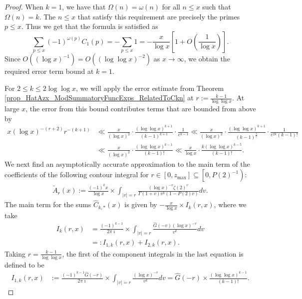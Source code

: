 \documentclass[11pt,reqno,a4letter]{article}
\numberwithin{figure}{section}
\numberwithin{table}{section}
\theoremstyle{plain}
\numberwithin{theorem}{section}
\theoremstyle{definition}
\begin{document}
\begin{proof} 
When $k = 1$, we have that $\Omega(n) = \omega(n)$ for all $n \leq x$ such that $\Omega(n) = k$. 
The $n \leq x$ that satisfy this requirement are precisely the primes $p \leq x$. 
Thus we get that the formula is satisfied as 
\[
\sum_{p \leq x} (-1)^{\omega(p)} C_1(p) = -\sum_{p \leq x} 1 = 
     - \frac{x}{\log x} \left[1 + O\left(\frac{1}{\log x}\right)\right]. 
\]
Since $O((\log x)^{-1}) = O((\log\log x)^{-2})$ as $x \rightarrow \infty$, 
we obtain the required error term bound at $k = 1$. 

For $2 \leq k \leq 2\log\log x$, we will apply the error estimate from 
Theorem \ref{prop_HatAzx_ModSummatoryFuncExps_RelatedToCkn} at 
$r := \frac{k-1}{\log\log x}$. 
At large $x$, the error from this bound contributes terms that are bounded from above by 
\begin{align*} 
x (\log x)^{-(r+2)} r^{-(k+1)} & \ll \frac{x}{(\log x)^2} \cdot 
     \frac{(\log\log x)^{k+1}}{(k-1)^{k+1}} \cdot \frac{1}{e^{k-1}} 
     \ll \frac{x}{(\log x)^2} \cdot \frac{(\log\log x)^{k+1}}{(k-1)^{\frac{3}{2}}} \cdot 
     \frac{1}{e^{2k} (k-1)!} \\ 
     & \ll \frac{x}{(\log x)^2} \cdot \frac{(\log\log x)^{k-1}}{(k-1)!} \ll 
     \frac{x}{\log x} \cdot \frac{k (\log\log x)^{k-5}}{(k-1)!}. 
\end{align*} 
We next find an asymptotically accurate approximation to the main term of the coefficients 
of the following contour integral for $r \in [0, z_{\max}] \subseteq \left[0, P(2)^{-1}\right)$: 
\begin{align} 
\label{eqn_WideTildeArx_CountourIntDef_v1} 
\widetilde{A}_r(x) := 
     \frac{(-1)^k x}{\log x} 
     \times \int_{|v|=r} \frac{(\log x)^{-v} \zeta(2)^{v}}{\Gamma(1+v) 
     v^{k} (1 - P(2) v)} dv. 
\end{align} 
The main term for the sums $\widehat{C}_{k,\ast}(x)$ 
is given by $-\frac{x}{\log x} \times I_k(r, x)$, where we take 
\begin{align*}
I_k(r, x) & = \frac{(-1)^{k-1}}{2\pi\imath} \times \int_{|v|=r} 
     \frac{\widehat{G}(-v) (\log x)^{-v}}{v^k} dv \\ 
     & =: I_{1,k}(r, x) + I_{2,k}(r, x). 
\end{align*}
Taking $r = \frac{k-1}{\log\log x}$, the 
first of the component integrals in the last equation is defined to be 
\begin{align*}
I_{1,k}(r, x) & := \frac{(-1)^{k-1} \widehat{G}(-r)}{2\pi\imath} \times \int_{|v|=r} 
     \frac{(\log x)^{-v}}{v^k} dv = \widehat{G}(-r) \times \frac{(\log\log x)^{k-1}}{(k-1)!}. 

\end{align*}
\end{proof}
\end{document}
